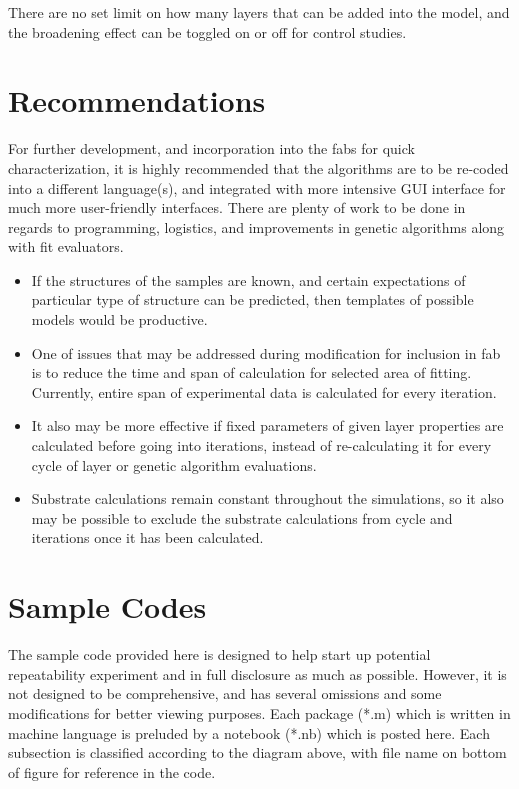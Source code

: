 There are no set limit on how many layers that can be added into the model, and the broadening effect can be toggled on or off for control studies.

\section{Recommendations}

For further development, and incorporation into the fabs for quick characterization, it is highly recommended that the algorithms are to be re-coded into a different language(s), and integrated with more intensive GUI interface for much more user-friendly interfaces.  There are plenty of work to be done in regards to programming, logistics, and improvements in genetic algorithms along with fit evaluators.  

\begin{itemize}
\item  If the structures of the samples are known, and certain expectations of particular type of structure can be predicted, then templates of possible models would be productive.
\item One of issues that may be addressed during modification for inclusion in fab  is to reduce the time and span of calculation for selected area of fitting.  Currently, entire span of experimental data is calculated for every iteration.
\item  It also may be more effective if fixed parameters of given layer properties are calculated before going into iterations, instead of re-calculating it for every cycle of layer or genetic algorithm evaluations.  
\item Substrate calculations remain constant throughout the simulations, so it also may be possible to exclude the substrate calculations from cycle and iterations once it has been calculated.
\end{itemize}

\section{Sample Codes}
The sample code provided here is designed to help start up potential repeatability experiment and in full disclosure as much as possible.  However, it is not designed to be comprehensive, and has several omissions and some modifications for better viewing purposes.  Each package (*.m) which is written in machine language is preluded by a notebook (*.nb)  which is posted here.  Each subsection is classified according to the diagram above, with file name on bottom of figure for reference in the code.

